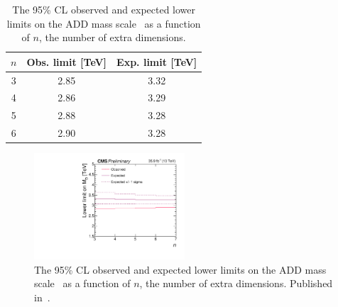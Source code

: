 \begin{table}[htbp]
  \begin{center}
    \caption{The 95\% CL observed and expected lower limits on the ADD mass scale \mD\ as a function of $n$, the number of extra dimensions.}
    \label{tab:MDLimits}
    \begin{tabular}{|c|c|c|}
      \hline
      $n$ & Obs. limit [TeV] & Exp. limit [TeV] \\
      \hline
      3 & 2.85 & 3.32 \\
      4 & 2.86 & 3.29 \\
      5 & 2.88 & 3.28\\
      6 & 2.90 & 3.28 \\
      \hline
    \end{tabular}
  \end{center}
\end{table}

\begin{figure}[htbp]
  \begin{center}
    \includegraphics[width=0.5\textwidth]{figures/exo16053/Figure_011.pdf}
    \caption{The 95\% CL observed and expected lower limits on the ADD mass scale \mD\ as a function of $n$, the number of extra dimensions.
    Published in~\cite{ref:JHEP02(2019)074}.}
    \label{fig:MDLimits}
  \end{center}
\end{figure}
